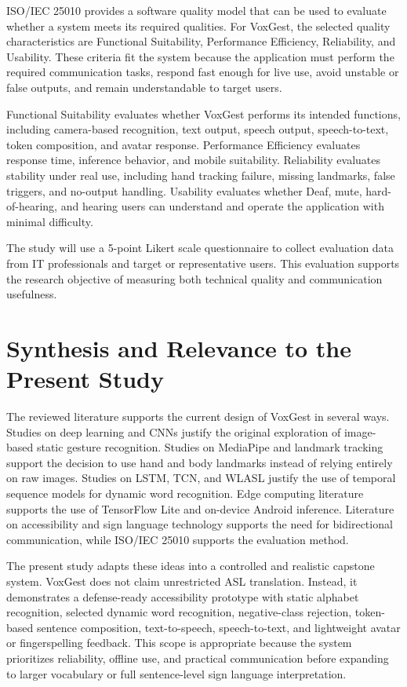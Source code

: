 ISO/IEC 25010 provides a software quality model that can be used to evaluate whether a system meets its required qualities. For VoxGest, the selected quality characteristics are Functional Suitability, Performance Efficiency, Reliability, and Usability. These criteria fit the system because the application must perform the required communication tasks, respond fast enough for live use, avoid unstable or false outputs, and remain understandable to target users.

Functional Suitability evaluates whether VoxGest performs its intended functions, including camera-based recognition, text output, speech output, speech-to-text, token composition, and avatar response. Performance Efficiency evaluates response time, inference behavior, and mobile suitability. Reliability evaluates stability under real use, including hand tracking failure, missing landmarks, false triggers, and no-output handling. Usability evaluates whether Deaf, mute, hard-of-hearing, and hearing users can understand and operate the application with minimal difficulty.

The study will use a 5-point Likert scale questionnaire to collect evaluation data from IT professionals and target or representative users. This evaluation supports the research objective of measuring both technical quality and communication usefulness.

\section{Synthesis and Relevance to the Present Study}

The reviewed literature supports the current design of VoxGest in several ways. Studies on deep learning and CNNs justify the original exploration of image-based static gesture recognition. Studies on MediaPipe and landmark tracking support the decision to use hand and body landmarks instead of relying entirely on raw images. Studies on LSTM, TCN, and WLASL justify the use of temporal sequence models for dynamic word recognition. Edge computing literature supports the use of TensorFlow Lite and on-device Android inference. Literature on accessibility and sign language technology supports the need for bidirectional communication, while ISO/IEC 25010 supports the evaluation method.

The present study adapts these ideas into a controlled and realistic capstone system. VoxGest does not claim unrestricted ASL translation. Instead, it demonstrates a defense-ready accessibility prototype with static alphabet recognition, selected dynamic word recognition, negative-class rejection, token-based sentence composition, text-to-speech, speech-to-text, and lightweight avatar or fingerspelling feedback. This scope is appropriate because the system prioritizes reliability, offline use, and practical communication before expanding to larger vocabulary or full sentence-level sign language interpretation.
